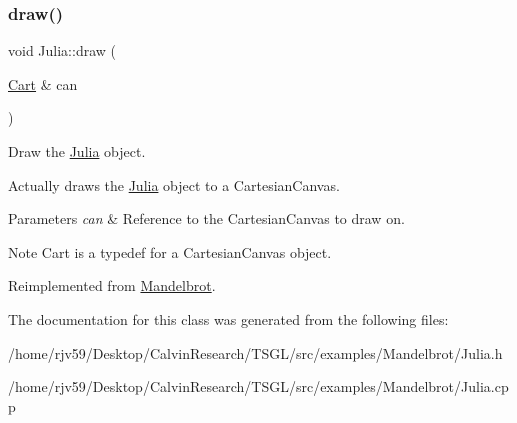 \subsubsection{\texorpdfstring{draw()}{draw()}}
{\footnotesize\ttfamily void Julia\+::draw (\begin{DoxyParamCaption}\item[{\hyperlink{classtsgl_1_1_cartesian_canvas}{Cart} \&}]{can }\end{DoxyParamCaption})\hspace{0.3cm}{\ttfamily [virtual]}}



Draw the \hyperlink{class_julia}{Julia} object. 

Actually draws the \hyperlink{class_julia}{Julia} object to a Cartesian\+Canvas. 
\begin{DoxyParams}{Parameters}
{\em can} & Reference to the Cartesian\+Canvas to draw on. \\
\hline
\end{DoxyParams}
\begin{DoxyNote}{Note}
Cart is a typedef for a Cartesian\+Canvas object. 
\end{DoxyNote}


Reimplemented from \hyperlink{class_mandelbrot_ab7918e4de8f00f73290f110ca7a6cffd}{Mandelbrot}.



The documentation for this class was generated from the following files\+:\begin{DoxyCompactItemize}
\item 
/home/rjv59/\+Desktop/\+Calvin\+Research/\+T\+S\+G\+L/src/examples/\+Mandelbrot/Julia.\+h\item 
/home/rjv59/\+Desktop/\+Calvin\+Research/\+T\+S\+G\+L/src/examples/\+Mandelbrot/Julia.\+cpp\end{DoxyCompactItemize}

